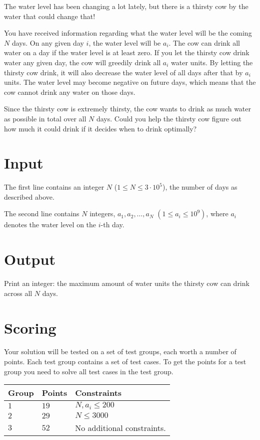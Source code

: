 
The water level has been changing a lot lately, but there is a thirsty cow by the water that could change that!

You have received information regarding what the water level will be the coming $N$ days. 
On any given day $i$, the water level will be $a_i$. The cow can drink all water on a day if the water level is at least zero.
If you let the thirsty cow drink water any given day, the cow will greedily drink all $a_i$ water units. 
By letting the thirsty cow drink, it will also decrease the water level of all days after that by $a_i$ units. 
The water level may become negative on future days, which means that the cow cannot drink any water on those days.

Since the thirsty cow is extremely thirsty, the cow wants to drink as much water as possible in total over all $N$ days.
Could you help the thirsty cow figure out how much it could drink if it decides when to drink optimally?

\section*{Input}
The first line contains an integer $N$ ($1 \leq N \leq 3 \cdot 10^5$), the number of days as described above.

The second line contains $N$ integers, $a_1, a_2, \dots, a_N$ $(1 \leq a_i \leq 10^9)$, where $a_i$ denotes the water level on the $i$-th day.

\section*{Output}
Print an integer: the maximum amount of water units the thirsty cow can drink across all $N$ days. 

\section*{Scoring}
Your solution will be tested on a set of test groups, each worth a number of points. Each test group contains
a set of test cases. To get the points for a test group you need to solve all test cases in the test group.

\noindent
\begin{tabular}{| l | l | p{12cm} |}
  \hline
  \textbf{Group} & \textbf{Points} & \textbf{Constraints} \\ \hline
  $1$    & $19$       & $N, a_i \leq 200$ \\ \hline
  $2$    & $29$       & $N \leq 3000$ \\ \hline
  $3$    & $52$       & No additional constraints. \\ \hline
\end{tabular}

